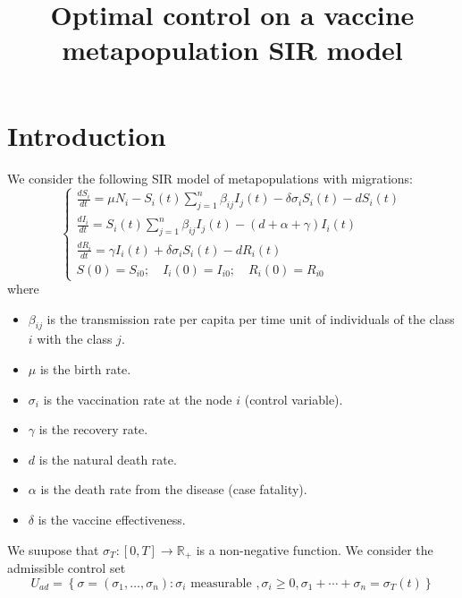 \documentclass[a4paper,10pt]{article}
\title{Optimal control on a vaccine metapopulation SIR model}
\author{
}
\theoremstyle{remark}
\begin{document}
\maketitle

\begin{abstract}

\end{abstract}


\section{Introduction}




We consider the following SIR model of metapopulations with migrations:
\begin{equation}
\left\{\begin{array}{l}\frac{d S_{i}}{d t}=\mu N_{i}-S_{i}(t) \sum_{j=1}^{n} \beta_{i j} I_{j}(t)-\delta \sigma_{i} S_{i}(t)-d S_{i}(t) \\ 
\frac{d I_{i}}{d t}=S_{i}(t) \sum_{j=1}^{n} \beta_{i j} I_{j}(t)-(d+\alpha+\gamma) I_{i}(t) \\ 
\frac{d R_{i}}{d t}=\gamma I_{i}(t)+\delta \sigma_{i} S_{i}(t)-d R_{i}(t)\\
S(0)=S_{i 0};\quad I_{i}(0)=I_{i 0};\quad R_{i}(0)=R_{i 0}
\end{array}\right. 
\end{equation}
where 
\begin{itemize}
\item $\beta_{ij}$ is the transmission rate per capita per time unit of individuals of the class $i$ with the class $j$.
\item $\mu$ is the birth rate. 
\item $\sigma_{i}$ is the vaccination rate at the node $i$ (control variable).
\item $\gamma$ is the recovery rate. 
\item $d$ is the natural death rate. 
\item $\alpha$ is the death rate from the disease (case fatality). 
\item $\delta$ is the vaccine effectiveness.
\end{itemize}

\def\svgwidth{9cm}


We suupose that $\sigma_{T}:[0,T]\to\mathbb{R}_+$ is a non-negative function. We consider the admissible control set
\[U_{ad}=\left\{\sigma=\left(\sigma_{1}, \ldots, \sigma_{n}\right): \sigma_{i}\right.\text{ measurable }, \left.\sigma_{i} \geqslant 0, \sigma_{1}+\cdots+\sigma_{n}=\sigma_{T}(t)\right\}\]
\end{document}
